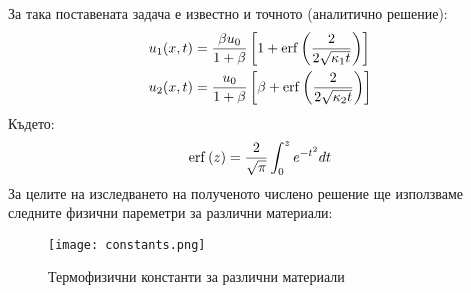 За така поставената задача е известно и точното (аналитично решение):
\begin{align}
	u_{1}(x, t) & = \frac{\beta u_0}{1+\beta} \left[1 + \operatorname{erf}{\left(\frac{2}{2\sqrt{\kappa_1 t}}\right)}\right] \\
	u_{2}(x, t) & = \frac{u_0}{1+\beta} \left[\beta + \operatorname{erf}{\left(\frac{2}{2\sqrt{\kappa_2 t}}\right)}\right]   
\end{align}
Където: 
\begin{equation*}
	\operatorname{erf}{(z)} = \frac{2}{\sqrt{\pi}} \displaystyle\int_{0}^{z} e ^{-t^2} dt
\end{equation*}
За целите на изследването на полученото числено решение ще използваме следните физични пареметри за различни материали:\\
\begin{figure}[h]
	\centering
	\texttt{[image: constants.png]}
	\caption{Термофизични константи за различни материали}
	\label{fig:constants}
\end{figure}

